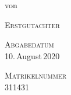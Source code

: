 \begin{titlepage}
\begin{flushleft}
        \vspace{1.0cm}
        
        {\rmfamily\normalsize
            von
            \texplateauthor
        }

        
        
        \vfill
        

        \begin{multicols}{3}
            \footnotesize
            \rmfamily

            \textsc{Erstgutachter}\\
            \texplatesupervisor

            \columnbreak

            \textsc{Abgabedatum}\\
            10.\,August\,2020 %
            
            \columnbreak

            \textsc{Matrikelnummer}\\
            311431

        \end{multicols}

    \end{flushleft}
\end{titlepage}

